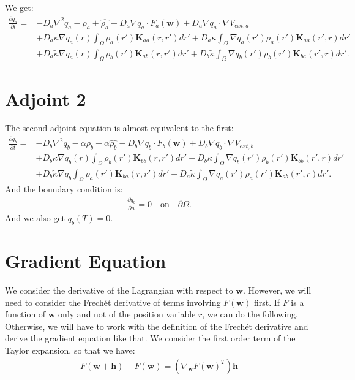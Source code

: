 \documentclass[11pt, a4paper]{article}
\theoremstyle{definition}
\newcommand{\adja}{q_a}
\newcommand{\adjb}{q_b}
\newcommand{\ra}{\rho_a}
\newcommand{\rb}{\rho_b}
\newcommand{\w}{\mathbf{w}}
\newcommand{\h}{\mathbf{h}}
\newcommand{\K}{\mathbf{K}}
\begin{document}
	We get:
	\begin{align*}
	 \frac{\partial \adja}{\partial t} = &- D_a\nabla^2\adja - \ra + \widehat{\ra}    - D_a\nabla \adja \cdot F_a(\w) + D_a \nabla \adja \cdot  \nabla V_{ext,a} \\
	 &+ D_a\kappa \nabla \adja(r) \int_\Omega \ra (r') \K_{aa}(r,r')dr' + D_a\kappa \int_\Omega \nabla \adja(r') \ra (r') \K_{aa}(r',r)dr' \\
	 & + D_a \tilde{\kappa} \nabla \adja(r) \int_\Omega  \rb (r') \K_{ab} (r,r')dr' + D_b \tilde \kappa\int_\Omega \nabla \adjb(r') \rb (r') \K_{ba}(r',r)dr' .
	\end{align*}
	\section{Adjoint 2}
	The second adjoint equation is almost equivalent to the first:
	\begin{align*}
	\frac{\partial \adjb}{\partial t} = &- D_b\nabla^2\adjb - \alpha \rb + \alpha \widehat{\rb}    - D_b\nabla \adjb \cdot F_b(\w) + D_b \nabla \adjb \cdot  \nabla V_{ext,b} \\
	&+ D_b\kappa \nabla \adjb(r) \int_\Omega \rb (r') \K_{bb}(r,r')dr' + D_b\kappa \int_\Omega \nabla \adjb(r') \rb (r') \K_{bb}(r',r)dr' \\
	& + D_b \tilde{\kappa} \nabla \adjb \int_\Omega  \ra (r') \K_{ba} (r,r')dr' + D_a \tilde \kappa\int_\Omega \nabla \adja(r') \ra (r') \K_{ab}(r',r)dr'.
	\end{align*}
	And the boundary condition is:
	\begin{align*}
	\frac{\partial \adjb}{\partial n} = 0 \quad \text{on} \quad \partial \Omega.
	\end{align*} 
	And we also get $\adjb(T) = 0$.
	
	\section{Gradient Equation}
	We consider the derivative of the Lagrangian with respect to $\w$. However, we will need to consider the Frech\'et derivative of terms involving $F(\w)$ first. If $F$ is a function of $\w$ only and not of the position variable $r$, we can do the following. Otherwise, we will have to work with the definition of the Frech\'et derivative and derive the gradient equation like that.
	We consider the first order term of the Taylor expansion, so that we have:
	\begin{align*}
	F(\w + \h) - F(\w) =  \left(\nabla_{\w} F(\w)^T\right) \h 
	\end{align*}
\end{document}
